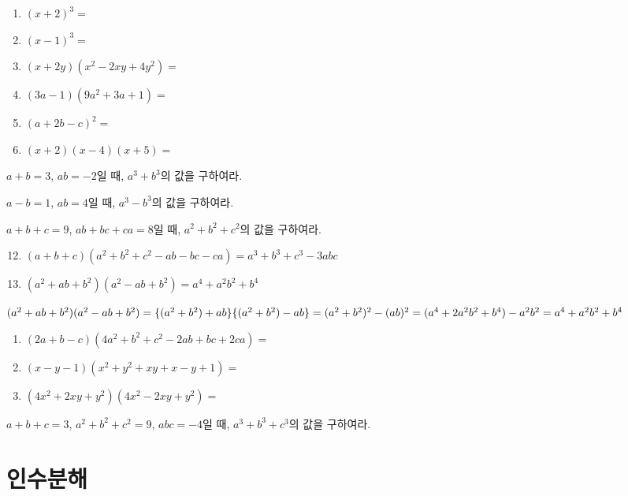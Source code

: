 \documentclass{oblivoir}
\begin{document}
%
\label{mult4}

%
\begin{enumerate}\label{mult5}
\item
\((x+2)^3=\)
\item
\((x-1)^3=\)
\item
\((x+2y)(x^2-2xy+4y^2)=\)
\item
\((3a-1)(9a^2+3a+1)=\)
\item
\((a+2b-c)^2=\)
\item
\((x+2)(x-4)(x+5)=\)
\end{enumerate}

%
\prob{}\label{mult6}
\(a+b=3\), \(ab=-2\)일 때, \(a^3+b^3\)의 값을 구하여라.

%
\prob{}\label{mult7}
\(a-b=1\), \(ab=4\)일 때, \(a^3-b^3\)의 값을 구하여라.

%
\prob{}\label{mult8}
\(a+b+c=9\), \(ab+bc+ca=8\)일 때, \(a^2+b^2+c^2\)의 값을 구하여라.

\newpage
%
\begin{mdframed}
\begin{enumerate}
\setcounter{enumi}{11}
\item\label{mult_12}
\((a+b+c)(a^2+b^2+c^2-ab-bc-ca)=a^3+b^3+c^3-3abc\)
\item\label{mult_13}
\((a^2+ab+b^2)(a^2-ab+b^2)=a^4+a^2b^2+b^4\)
\end{enumerate}
\end{mdframed}

%
\((a^2+ab+b^2)(a^2-ab+b^2)=\{(a^2+b^2)+ab\}\{(a^2+b^2)-ab\}\\
=(a^2+b^2)^2-(ab)^2=(a^4+2a^2b^2+b^4)-a^2b^2=a^4+a^2b^2+b^4\)

%
\label{mult9}

%
\begin{enumerate}\label{mult10}
\item
\((2a+b-c)(4a^2+b^2+c^2-2ab+bc+2ca)=\)
\item
\((x-y-1)(x^2+y^2+xy+x-y+1)=\)
\item
\((4x^2+2xy+y^2)(4x^2-2xy+y^2)=\)
\end{enumerate}

%
\prob{}\label{mult11}
\(a+b+c=3\), \(a^2+b^2+c^2=9\), \(abc=-4\)일 때, \(a^3+b^3+c^3\)의 값을 구하여라.

\section{인수분해}
\end{document}
